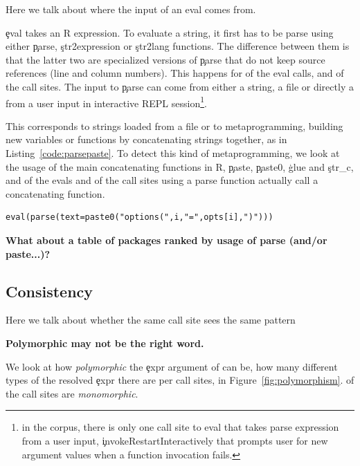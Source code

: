 \documentclass[conference]{IEEEtran}
\begin{document}
Here we talk about where the input of an eval comes from.

\c{eval} takes an R expression. To evaluate a string, it first has to be parse
using either \c{parse}, \c{str2expression} or \c{str2lang} functions. The
difference between them is that the latter two are specialized versions of
\c{parse} that do not keep source references (line and column numbers). This
happens for \PercentParsedEvals of the eval calls, and \PercentParsedCallSites
of the call sites. The input to \c{parse} can come from either a string, a file
or directly a from a user input in interactive REPL session\footnote{in the
  corpus, there is only one call site to eval that takes parse expression from a
  user input, \c{invokeRestartInteractively} that prompts user for new argument
  values when a function invocation fails.}.


This corresponds to strings loaded from a file or to metaprogramming, \ie
building new variables or functions by concatenating strings together, as in
Listing~\ref{code:parsepaste}. To detect this kind of metaprogramming, we look
at the usage of the main concatenating functions in R, \c{paste}, \c{paste0},
\c{glue} and \c{str_c}, and \PasteParsedEvals of the evals and
\PasteParsedCallSite of the call sites using a parse function actually call a
concatenating function.


\begin{lstlisting}[caption={Using \c{eval} and \c{parse} to do meta-programming in package \emph{data.table}, to build the options at load time (in \emph{onLoad.R}).}, label=code:parsepaste]
eval(parse(text=paste0("options(",i,"=",opts[i],")")))
\end{lstlisting}

\textbf{What about a table of packages ranked by usage of parse (and/or paste...)?}


\subsection{Consistency}

Here we talk about whether the same call site sees the same pattern

{\bf Polymorphic may not be the right word.}

We look at how \emph{polymorphic} the \c{expr} argument of \eval can be, \ie
how many different types of the resolved \c{expr} there are per call sites,
in Figure~\ref{fig:polymorphism}. \PercentMonomorphic of the call sites are
\emph{monomorphic}.
\end{document}

